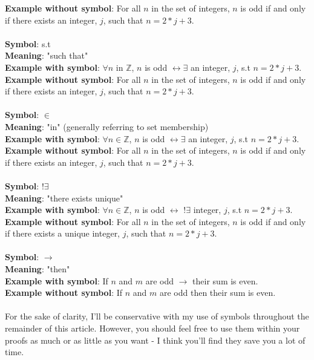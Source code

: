 \documentclass[a4paper,12pt]{article}
\begin{document}
\textbf{Example without symbol}: For all $n$ in the set of integers, $n$ is odd if and only if there exists an integer, $j$, such that $n = 2*j + 3$.\\ 
\\
\textbf{Symbol}: s.t\\
\textbf{Meaning}: "such that"\\
\textbf{Example with symbol}: $\forall n$ in $\mathbb{Z}$, $n$ is odd $\leftrightarrow  \exists$ an integer, $j$, s.t $n = 2*j + 3$.\\
\textbf{Example without symbol}: For all $n$ in the set of integers, $n$ is odd if and only if there exists an integer, $j$, such that $n = 2*j + 3$.\\ 
\\
\textbf{Symbol}: $\in$\\
\textbf{Meaning}: "in" (generally referring to set membership)\\
\textbf{Example with symbol}: $\forall n \in \mathbb{Z}$, $n$ is odd $\leftrightarrow  \exists$ an integer, $j$, s.t $n = 2*j + 3$.\\
\textbf{Example without symbol}: For all $n$ in the set of integers, $n$ is odd if and only if there exists an integer, $j$, such that $n = 2*j + 3$.\\ 
\\
\textbf{Symbol}: $!\exists$\\
\textbf{Meaning}: "there exists unique"\\
\textbf{Example with symbol}: $\forall n \in \mathbb{Z}$, $n$ is odd $\leftrightarrow$ $!\exists$ integer, $j$, s.t $n = 2*j + 3$.\\
\textbf{Example without symbol}: For all $n$ in the set of integers, $n$ is odd if and only if there exists a unique integer, $j$, such that $n = 2*j + 3$.\\ 
\\
\textbf{Symbol}: $\rightarrow$\\
\textbf{Meaning}: "then"\\
\textbf{Example with symbol}: If $n$ and $m$ are odd $\rightarrow$ their sum is even.\\
\textbf{Example without symbol}: If $n$ and $m$ are odd then their sum is even.\\
\\
For the sake of clarity, I'll be conservative with my use of symbols throughout the remainder of this article. However, you should feel free to use them within your proofs as much or as little as you want - I think you'll find they save you a lot of time.
\end{document}
